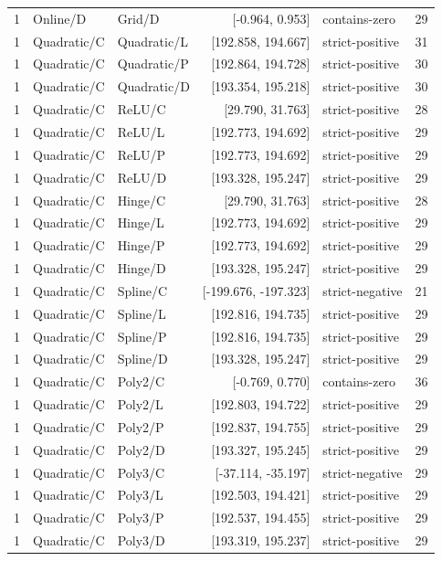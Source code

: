 \begin{longtable}{lllrlr}
1 & Online/D & Grid/D & [-0.964, 0.953] & contains-zero & 29 \\
1 & Quadratic/C & Quadratic/L & [192.858, 194.667] & strict-positive & 31 \\
1 & Quadratic/C & Quadratic/P & [192.864, 194.728] & strict-positive & 30 \\
1 & Quadratic/C & Quadratic/D & [193.354, 195.218] & strict-positive & 30 \\
1 & Quadratic/C & ReLU/C & [29.790, 31.763] & strict-positive & 28 \\
1 & Quadratic/C & ReLU/L & [192.773, 194.692] & strict-positive & 29 \\
1 & Quadratic/C & ReLU/P & [192.773, 194.692] & strict-positive & 29 \\
1 & Quadratic/C & ReLU/D & [193.328, 195.247] & strict-positive & 29 \\
1 & Quadratic/C & Hinge/C & [29.790, 31.763] & strict-positive & 28 \\
1 & Quadratic/C & Hinge/L & [192.773, 194.692] & strict-positive & 29 \\
1 & Quadratic/C & Hinge/P & [192.773, 194.692] & strict-positive & 29 \\
1 & Quadratic/C & Hinge/D & [193.328, 195.247] & strict-positive & 29 \\
1 & Quadratic/C & Spline/C & [-199.676, -197.323] & strict-negative & 21 \\
1 & Quadratic/C & Spline/L & [192.816, 194.735] & strict-positive & 29 \\
1 & Quadratic/C & Spline/P & [192.816, 194.735] & strict-positive & 29 \\
1 & Quadratic/C & Spline/D & [193.328, 195.247] & strict-positive & 29 \\
1 & Quadratic/C & Poly2/C & [-0.769, 0.770] & contains-zero & 36 \\
1 & Quadratic/C & Poly2/L & [192.803, 194.722] & strict-positive & 29 \\
1 & Quadratic/C & Poly2/P & [192.837, 194.755] & strict-positive & 29 \\
1 & Quadratic/C & Poly2/D & [193.327, 195.245] & strict-positive & 29 \\
1 & Quadratic/C & Poly3/C & [-37.114, -35.197] & strict-negative & 29 \\
1 & Quadratic/C & Poly3/L & [192.503, 194.421] & strict-positive & 29 \\
1 & Quadratic/C & Poly3/P & [192.537, 194.455] & strict-positive & 29 \\
1 & Quadratic/C & Poly3/D & [193.319, 195.237] & strict-positive & 29 \\

\end{longtable}
